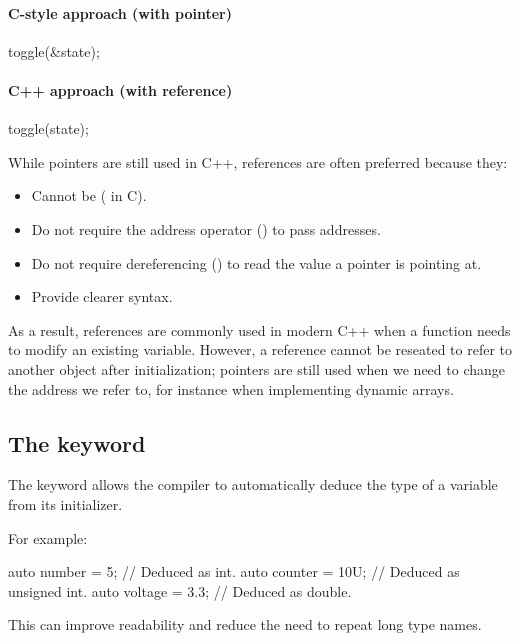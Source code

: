 \paragraph{C-style approach (with pointer)}

\begin{ccode}
toggle(&state);
\end{ccode}

\paragraph{C++ approach (with reference)}

\begin{cppcode}
toggle(state);
\end{cppcode}

\noindent While pointers are still used in C++, references are often preferred because they:
\begin{itemize}
  \item Cannot be  ( in C).
  \item Do not require the address operator (\code{&}) to pass addresses.
  \item Do not require dereferencing (\code{*}) to read the value a pointer is pointing at.
  \item Provide clearer syntax.
\end{itemize}
As a result, references are commonly used in modern C++ when a function needs to modify an
existing variable. However, a reference cannot be reseated to refer to another object after
initialization; pointers are still used when we need to change the address we refer to, for
instance when implementing dynamic arrays.

\subsection{The  keyword}
\label{c1:sec:auto}
The keyword  allows the compiler to automatically deduce the type of a variable from
its initializer.

For example:

\begin{cppcode}
auto number  = 5;   // Deduced as int.
auto counter = 10U; // Deduced as unsigned int.
auto voltage = 3.3; // Deduced as double.
\end{cppcode}

\noindent This can improve readability and reduce the need to repeat long type names.

